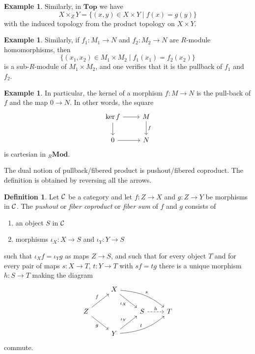 \documentclass[11pt]{amsbook}
\DeclareMathOperator\Mod{{\bf{Mod}}}
\def\Top{\mathbf{Top}}
\def\Mod{\mathbf{Mod}}
\theoremstyle{plain}
\theoremstyle{definition}
\newtheorem{definition}[theorem]{Definition}
\newtheorem{example}[theorem]{Example}
\begin{document}
\begin{example}
Similarly, in $\Top$ we have
\[
	X\times_Z Y = \{ (x,y) \in X\times Y \mid f(x) = g(y) \}
\]
with the induced topology from the product topology on $X\times Y$.
\end{example}

\begin{example}
Similarly, if $f_1\colon M_1 \to N$ and $f_2\colon M_2 \to N$ are $R$-module homomorphisms, then
\[
	\{ (x_1,x_2) \in M_1\times M_2 \mid f_1(x_1)=f_2(x_2) \}
\]
is a sub-$R$-module of $M_1\times M_2$, and one verifies that it is the pullback of $f_1$ and $f_2$.
\end{example}

\begin{example}In particular, the kernel of a morphism $f\colon M\to N$ is the pull-back of $f$ and the map $0\to N$. In other words, the square
\[
	\begin{tikzcd}
		\ker f \arrow{r} \arrow{d} & M \arrow{d}{f} \\
		0 \arrow{r} & N
	\end{tikzcd}
\]
is cartesian in ${}_R\Mod$.
\end{example}

The dual notion of pullback/fibered product is pushout/fibered coproduct. The definition is obtained by reversing all the arrows.

\begin{definition}
Let ${\mathcal{C}}$ be a category and let  $f\colon Z\to X$ and $g\colon Z\to Y$ be morphisms in ${\mathcal{C}}$. The \emph{pushout} or \emph{fiber coproduct} or \emph{fiber sum} of $f$ and $g$ consists of 
\begin{enumerate}
\item an object $S$ in ${\mathcal{C}}$
\item morphisms $\iota_X\colon X \to S$ and $\iota_Y\colon Y \to S$
\end{enumerate}
such that $\iota_Xf=\iota_Yg$ as maps $Z\to S$, and such that for every object $T$ and for every pair of maps $s\colon X\to T$, $t\colon Y\to T$ with $sf=tg$
there is a unique morphism $h\colon S\to T$ making the diagram
\[
\begin{tikzcd}
&X \arrow[swap]{rd}{\iota_X} \arrow[out=-5,in=140]{rrd}{s} & & \\
Z \arrow{ru}{f} \arrow[swap]{rd}{g} && S \arrow[dashed]{r}{h} & T \\
 & Y \arrow{ru}{\iota_Y} \arrow[out=5,in=-140]{rru}{t} & & 
\end{tikzcd}
\]
commute.
\end{definition}
\end{document}
